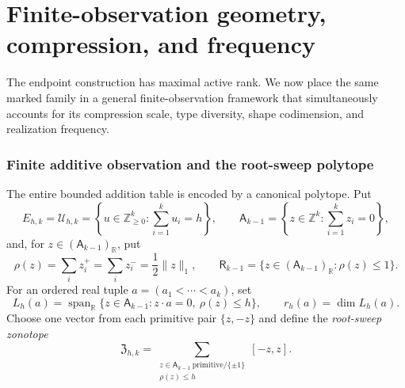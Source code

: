 \documentclass[11pt,reqno]{amsart}
\theoremstyle{definition}
\theoremstyle{remark}
\begin{document}
\part{Finite-observation geometry, compression, and frequency}
\label{part:structure}

The endpoint construction has maximal active rank.  We now place the same
marked family in a general finite-observation framework that simultaneously
accounts for its compression scale, type diversity, shape codimension, and
realization frequency.

\section{Finite additive observation and the root-sweep polytope}
\label{sec:root-sweep-dictionary}

The entire bounded addition table is encoded by a canonical polytope.  Put
\[
 E_{h,k}=\mathcal U_{h,k}
 =\left\{u\in\mathbb Z_{\geq0}^k:\sum_{i=1}^ku_i=h\right\},
 \qquad
 \mathsf A_{k-1}=\left\{z\in\mathbb Z^k:\sum_{i=1}^kz_i=0\right\},
\]
and, for $z\in(\mathsf A_{k-1})_{\mathbb R}$, put
\[
 \rho(z)=\sum_i z_i^+=\sum_i z_i^-=\frac12\lVert z\rVert_1,
 \qquad
 \mathsf R_{k-1}=\{z\in(\mathsf A_{k-1})_{\mathbb R}:\rho(z)\leq1\}.
\]
For an ordered real tuple $a=(a_1<\cdots<a_k)$, set
\[
 L_h(a)=\operatorname{span}_{\mathbb R}
 \{z\in\mathsf A_{k-1}:z\cdot a=0,\ \rho(z)\leq h\},
 \qquad r_h(a)=\dim L_h(a).
\]
Choose one vector from each primitive pair $\{z,-z\}$ and define the
\emph{root-sweep zonotope}
\begin{equation}\label{eq:root-sweep-zonotope}
 \mathfrak Z_{h,k}=
 \sum_{\substack{z\in\mathsf A_{k-1}\ \mathrm{primitive}/\{\pm1\}\\
                  \rho(z)\leq h}}[-z,z].
\end{equation}
\end{document}
